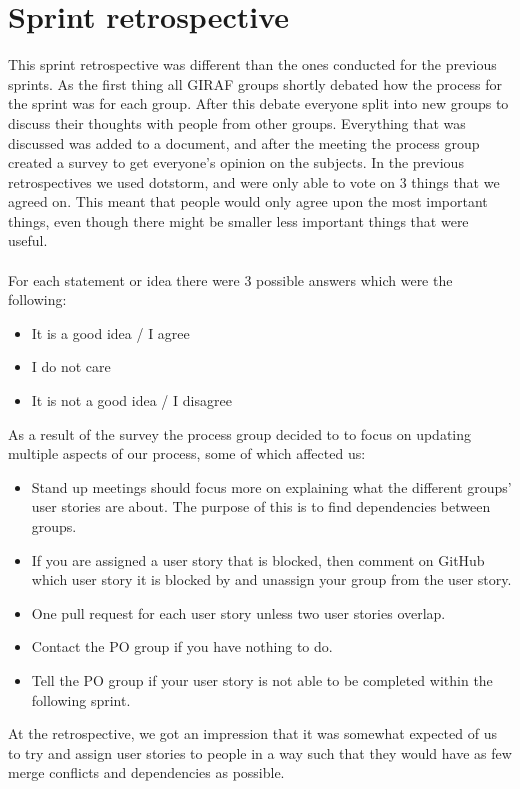 \section{Sprint retrospective}
This sprint retrospective was different than the ones conducted for the previous sprints.
As the first thing all GIRAF groups shortly debated how the process for the sprint was for each group.
After this debate everyone split into new groups to discuss their thoughts with people from other groups.
Everything that was discussed was added to a document, and after the meeting the process group created a survey to get everyone's opinion on the subjects.
In the previous retrospectives we used dotstorm, and were only able to vote on 3 things that we agreed on.
This meant that people would only agree upon the most important things, even though there might be smaller less important things that were useful.
\\\\
For each statement or idea there were 3 possible answers which were the following:
\begin{itemize}
    \item It is a good idea / I agree
    \item I do not care
    \item It is not a good idea / I disagree
\end{itemize}
As a result of the survey the process group decided to to focus on updating multiple aspects of our process, some of which affected us:
\begin{itemize}
    \item Stand up meetings should focus more on explaining what the different groups' user stories are about. The purpose of this is to find dependencies between groups.
    \item If you are assigned a user story that is blocked, then comment on GitHub which user story it is blocked by and unassign your group from the user story.
    \item One pull request for each user story unless two user stories overlap.
    \item Contact the PO group if you have nothing to do.
    \item Tell the PO group if your user story is not able to be completed within the following sprint.
\end{itemize}
\noindent
At the retrospective, we got an impression that it was somewhat expected of us to try and assign user stories to people in a way such that they would have as few merge conflicts and dependencies as possible.
